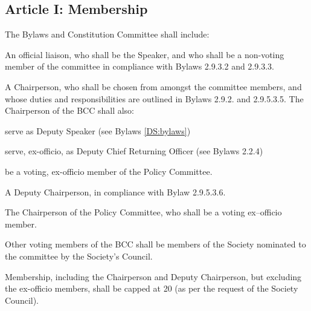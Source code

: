 \subsection{Article I: Membership}
\begin{longenum}[ label*=\thesubsection.\arabic*., align=left] 
\item The Bylaws and Constitution Committee shall include:
	\begin{longenum}[ label*=\arabic*., align=left] 
	\item An official liaison, who shall be the Speaker, and who shall be a non-voting member of the committee in compliance with Bylaws 2.9.3.2 and 2.9.3.3.
	\item A Chairperson, who shall be chosen from amongst the committee members, and whose duties and responsibilities are outlined in Bylaws 2.9.2. and 2.9.5.3.5. The Chairperson of the BCC shall also:
		\begin{longenum}[ label*=\arabic*., align=left] 
		\item serve as Deputy Speaker (see Bylaws \ref{DS:bylaws})
		\item serve, ex-officio, as Deputy Chief Returning Officer (see Bylaws 2.2.4)
		\item be a voting, ex-officio member of the Policy Committee.
		\end{longenum}
	\item A Deputy Chairperson, in compliance with Bylaw 2.9.5.3.6.
	\item The Chairperson of the Policy Committee, who shall be a voting ex–officio member.
	\end{longenum}
\item Other voting members of the BCC shall be members of the Society nominated to the committee by the Society's Council.
\item Membership, including the Chairperson and Deputy Chairperson, but excluding the ex-officio members, shall be capped at 20 (as per the request of the Society Council).
\end{longenum}

